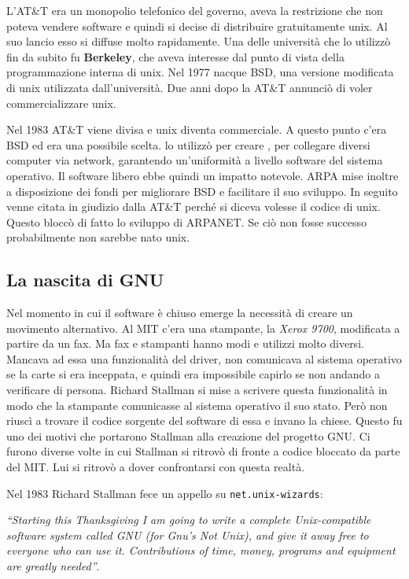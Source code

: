 L'AT\&T era un monopolio telefonico del governo, aveva la restrizione che non poteva vendere software e quindi si decise di distribuire gratuitamente unix. Al suo lancio esso si diffuse molto rapidamente. Una delle università che lo utilizzò fin da subito fu \textbf{Berkeley}, che aveva interesse dal punto di vista della programmazione interna di unix. Nel 1977 nacque BSD, una versione modificata di unix utilizzata dall'università. Due anni dopo la AT\&T annunciò di voler commercializzare unix. 

Nel 1983 AT\&T viene divisa e unix diventa commerciale. A questo punto c'era BSD ed era una possibile scelta.  lo utilizzò per creare , per collegare diversi computer via network, garantendo un'uniformità a livello software del sistema operativo. Il software libero ebbe quindi un impatto notevole. ARPA mise inoltre a disposizione dei fondi per migliorare BSD e facilitare il suo sviluppo. In seguito venne citata in giudizio dalla AT\&T perché si diceva volesse il codice di unix. Questo bloccò di fatto lo sviluppo di ARPANET. Se ciò non fosse successo probabilmente non sarebbe nato unix.

\subsection{La nascita di GNU}

Nel momento in cui il software è chiuso emerge la necessità di creare un movimento alternativo. Al MIT c'era una stampante, la \textit{Xerox 9700}, modificata a partire da un fax. Ma fax e stampanti hanno modi e utilizzi molto diversi. Mancava ad essa una funzionalità del driver, non comunicava al sistema operativo se la carte si era inceppata, e quindi era impossibile capirlo se non andando a verificare di persona. Richard Stallman si mise a scrivere questa funzionalità in modo che la stampante comunicasse al sistema operativo il suo stato. Però non riuscì a trovare il codice sorgente del software di essa e invano la chiese. Questo fu uno dei motivi che portarono Stallman alla creazione del progetto GNU. Ci furono diverse volte in cui Stallman si ritrovò di fronte a codice bloccato da parte del MIT. Lui si ritrovò a dover confrontarsi con questa realtà.

Nel 1983 Richard Stallman fece un appello su \texttt{net.unix-wizards}:

\begin{center}
	\textit{``Starting this Thanksgiving I am going to write a complete Unix-compatible software system called GNU (for Gnu’s Not Unix), and give it away free to everyone who can use it. Contributions of time, money, programs and equipment are greatly needed''}.
\end{center}

